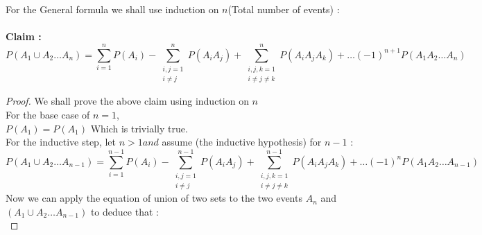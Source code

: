 \documentclass{article}
\begin{document}
For the General formula we shall use induction on $n$(Total number of events) : \\
\\
\textbf{Claim :}  \\
$$ P(A_1 \cup A_2 \dots A_n) = \sum_{i=1}^{n}P(A_i)  -  \sum_{\substack{i,j =1 \\ i \neq j}}^{n}P(A_i A_j)  +  \sum_{\substack{i,j,k = 1 \\ i \neq j \neq k}}^{n}P(A_i A_j A_k)  +  \dots   (-1)^{n+1}P(A_1 A_2 \dots A_n)$$
\begin{proof}
	We shall prove the above claim using induction on $n$ \\
	For the base case of $n = 1$, \\
	$P(A_1) = P(A_1)$
	Which is trivially true. \\
	For the inductive step, let $n > 1 and$ assume (the inductive hypothesis) for $n-1$ : \\
	\begin{equation}
	\label{(2)}
	P(A_1 \cup A_2 \dots A_{n-1}) = \sum_{i=1}^{n-1}P(A_i) - \sum_{\substack{i,j =1 \\ i \neq j}}^{n-1}P(A_i A_j) + \sum_{\substack{i,j,k = 1  \\ i \neq j \neq k}}^{n-1}P(A_i A_j A_k) + \dots   (-1)^{n}P(A_1 A_2 \dots A_{n-1})
	\end{equation}
	Now we can apply the equation of union of two sets to the two events $A_n$ and $(A_1 \cup A_2 \dots A_{n-1})$ to deduce that : \\
	

\end{proof}
\end{document}
